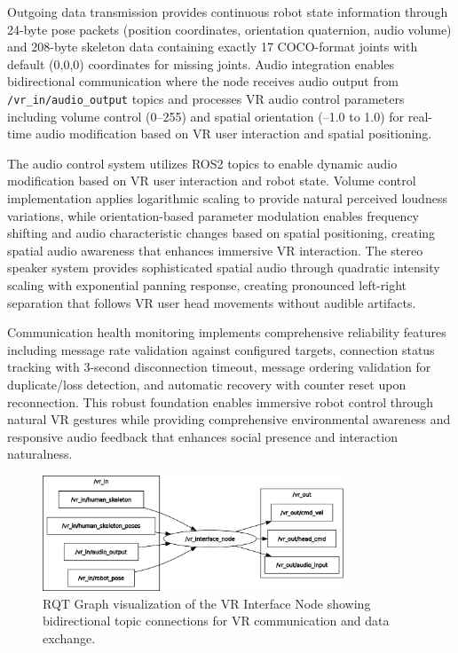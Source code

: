 Outgoing data transmission provides continuous robot state information through 24-byte pose packets (position coordinates, orientation quaternion, audio volume) and 208-byte skeleton data containing exactly 17 COCO-format joints with default (0,0,0) coordinates for missing joints. Audio integration enables bidirectional communication where the node receives audio output from \texttt{/vr\_in/audio\_output} topics and processes VR audio control parameters including volume control (0--255) and spatial orientation (--1.0 to 1.0) for real-time audio modification based on VR user interaction and spatial positioning.

The audio control system utilizes ROS2 topics to enable dynamic audio modification based on VR user interaction and robot state. Volume control implementation applies logarithmic scaling to provide natural perceived loudness variations, while orientation-based parameter modulation enables frequency shifting and audio characteristic changes based on spatial positioning, creating spatial audio awareness that enhances immersive VR interaction. The stereo speaker system provides sophisticated spatial audio through quadratic intensity scaling with exponential panning response, creating pronounced left-right separation that follows VR user head movements without audible artifacts.

Communication health monitoring implements comprehensive reliability features including message rate validation against configured targets, connection status tracking with 3-second disconnection timeout, message ordering validation for duplicate/loss detection, and automatic recovery with counter reset upon reconnection. This robust foundation enables immersive robot control through natural VR gestures while providing comprehensive environmental awareness and responsive audio feedback that enhances social presence and interaction naturalness.

\begin{figure}[H]
    \centering
    \includegraphics[width=0.8\textwidth]{Images/vrnode.png}
    \caption{RQT Graph visualization of the VR Interface Node showing bidirectional topic connections for VR communication and data exchange.}
    \label{fig:rqt_vr_interface_node}
\end{figure}

